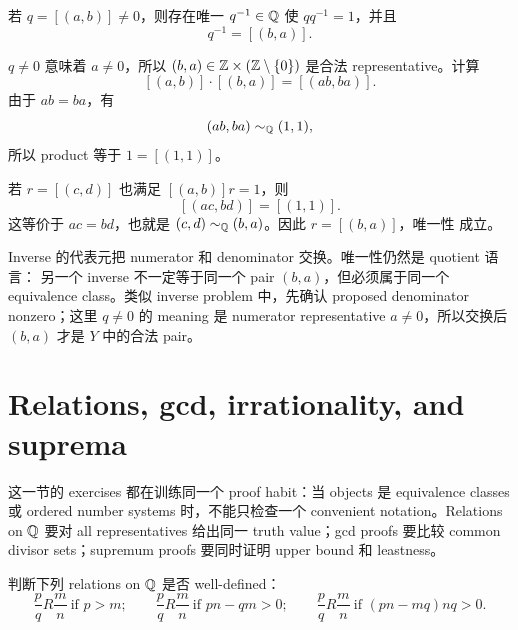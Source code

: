 \begin{proposition}
若 \(q=[(a,b)]\neq0\)，则存在唯一 \(q^{-1}\in\mathbb{Q}\) 使 \(qq^{-1}=1\)，并且
\[
  q^{-1}=[(b,a)].
\]
\end{proposition}

\begin{solution}
\(q\neq0\) 意味着 \(a\neq0\)，所以 \((b,a)\in\mathbb{Z}\times(\mathbb{Z}\setminus\{0\})\) 是合法
representative。计算
\[
[(a,b)]\cdot[(b,a)]=[(ab,ba)].
\]
由于 \(ab=ba\)，有
\[
  (ab,ba)\sim_{\mathbb{Q}}(1,1),
\]
所以 product 等于 \(1=[(1,1)]\)。

若 \(r=[(c,d)]\) 也满足 \([(a,b)]r=1\)，则
\[
  [(ac,bd)]=[(1,1)].
\]
这等价于 \(ac=bd\)，也就是 \((c,d)\sim_{\mathbb{Q}}(b,a)\)。因此 \(r=[(b,a)]\)，唯一性
成立。
\end{solution}

\begin{explanation}
Inverse 的代表元把 numerator 和 denominator 交换。唯一性仍然是 quotient 语言：
另一个 inverse 不一定等于同一个 pair \((b,a)\)，但必须属于同一个 equivalence
class。类似 inverse problem 中，先确认 proposed denominator nonzero；这里
\(q\neq0\) 的 meaning 是 numerator representative \(a\neq0\)，所以交换后
\((b,a)\) 才是 \(Y\) 中的合法 pair。
\end{explanation}

\section{Relations, gcd, irrationality, and suprema}

这一节的 exercises 都在训练同一个 proof habit：当 objects 是 equivalence classes
或 ordered number systems 时，不能只检查一个 convenient notation。Relations on
\(\mathbb{Q}\) 要对 all representatives 给出同一 truth value；gcd proofs 要比较 common
divisor sets；supremum proofs 要同时证明 upper bound 和 leastness。

\begin{exerciseblock}
判断下列 relations on \(\mathbb{Q}\) 是否 well-defined：
\[
\frac pq R\frac mn\ \text{if }p>m;\qquad
\frac pq R\frac mn\ \text{if }pn-qm>0;\qquad
\frac pq R\frac mn\ \text{if }(pn-mq)nq>0.
\]
\end{exerciseblock}


